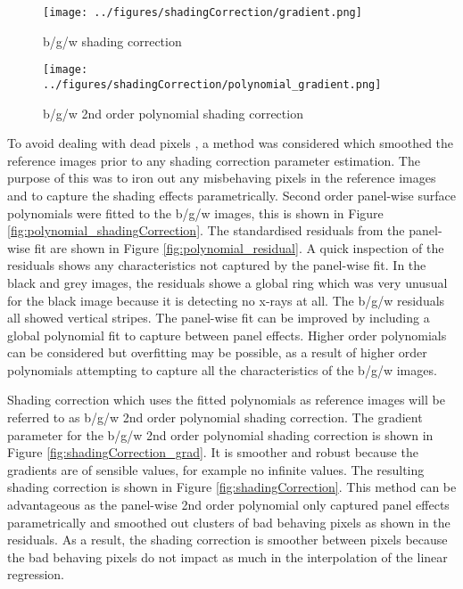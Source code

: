 \documentclass[a4paper]{proc}
\begin{document}
\begin{figure*}
	\centering
	\begin{subfigure}{0.45\textwidth}
		\texttt{[image: ../figures/shadingCorrection/gradient.png]}
		\caption{b/g/w shading correction}
	\end{subfigure}
	\begin{subfigure}{0.45\textwidth}
		\texttt{[image: ../figures/shadingCorrection/polynomial\_gradient.png]}
		\caption{b/g/w 2nd order polynomial shading correction}
	\end{subfigure}
	\caption{The gradient used in b/g/w shading correction. Red circles indicate infinite gradient, green circles indicate negative gradient.}
	\label{fig:shadingCorrection_grad}
\end{figure*}

To avoid dealing with dead pixels \cite{brettschneider2014spatial}, a method was considered which smoothed the reference images prior to any shading correction parameter estimation. The purpose of this was to iron out any misbehaving pixels in the reference images and to capture the shading effects parametrically. Second order panel-wise surface polynomials were fitted to the b/g/w images, this is shown in Figure \ref{fig:polynomial_shadingCorrection}. The standardised residuals from the panel-wise fit are shown in Figure \ref{fig:polynomial_residual}. A quick inspection of the residuals shows any characteristics not captured by the panel-wise fit. In the black and grey images, the residuals showe a global ring which was very unusual for the black image because it is detecting no x-rays at all. The b/g/w residuals all showed vertical stripes. The panel-wise fit can be improved by including a global polynomial fit to capture between panel effects. Higher order polynomials can be considered but overfitting may be possible, as a result of higher order polynomials attempting to capture all the characteristics of the b/g/w images.

Shading correction which uses the fitted polynomials as reference images will be referred to as b/g/w 2nd order polynomial shading correction. The gradient parameter for the b/g/w 2nd order polynomial shading correction is shown in Figure \ref{fig:shadingCorrection_grad}. It is smoother and robust because the gradients are of sensible values, for example no infinite values. The resulting shading correction is shown in Figure \ref{fig:shadingCorrection}. This method can be advantageous as the panel-wise 2nd order polynomial only captured panel effects parametrically and smoothed out clusters of bad behaving pixels as shown in the residuals. As a result, the shading correction is smoother between pixels because the bad behaving pixels do not impact as much in the interpolation of the linear regression.
\end{document}
